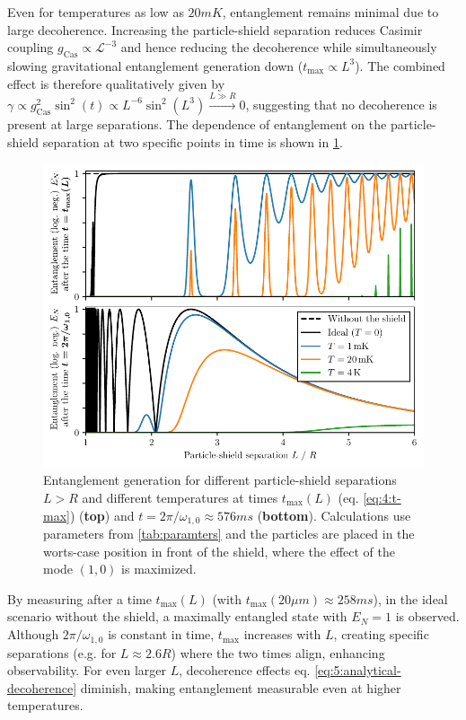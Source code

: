 Even for temperatures as low as $20\si{mK}$, entanglement remains minimal due to large decoherence.
Increasing the particle-shield separation reduces Casimir coupling $g_\mathrm{Cas} \propto \mathscr{L}^{-3}$ and hence reducing the decoherence while simultaneously slowing gravitational entanglement generation down ($t_\mathrm{max} \propto L^3$).
The combined effect is therefore qualitatively given by $\gamma \propto g_\mathrm{Cas}^2 \sin^2(t) \propto L^{-6} \sin^2(L^3) \xrightarrow{L \gg R} 0$, suggesting that no decoherence is present at large separations.
The dependence of entanglement on the particle-shield separation at two specific points in time is shown in \cref{fig:5:entanglement-thermal-shield-L}.
\begin{figure}[!htbp]
  \centering
  \includegraphics[width=\textwidth]{./../figures/vibrations/all-modes-entanglement-L.pdf}
  \caption{Entanglement generation for different particle-shield separations $L > R$ and different temperatures at times $t_\mathrm{max}(L)$ (eq. \eqref{eq:4:t-max}) (\textbf{top}) and $t = 2\pi/\omega_{1,0}\approx 576\si{ms}$ (\textbf{bottom}). Calculations use parameters from \cref{tab:paramters} and the particles are placed in the worts-case position in front of the shield, where the effect of the mode $(1,0)$ is maximized.}
  \label{fig:5:entanglement-thermal-shield-L}
\end{figure}

By measuring after a time $t_\mathrm{max}(L)$ (with $t_\mathrm{max}(20\si{\mu m}) \approx 258\si{ms}$), in the ideal scenario without the shield, a maximally entangled state with $E_N = 1$ is observed.
Although $2\pi/\omega_{1,0}$ is constant in time, $t_\mathrm{max}$ increases with $L$, creating specific separations (e.g. for $L\approx 2.6R$) where the two times align, enhancing observability.
For even larger $L$, decoherence effects eq. \eqref{eq:5:analytical-decoherence} diminish, making entanglement measurable even at higher temperatures.

